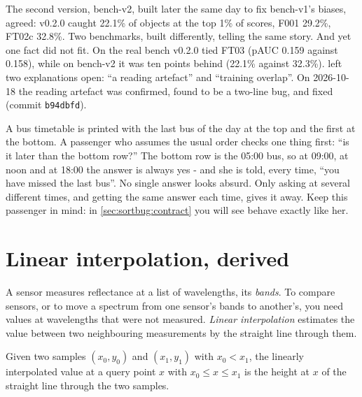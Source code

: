 
The second version, bench-v2, built later the same day to fix bench-v1's biases, agreed: v0.2.0 caught 22.1\%
of objects at the top 1\% of scores, F001 29.2\%, FT02c 32.8\%.
Two benchmarks, built differently, telling the same story. And yet one fact did not fit. On the real bench
v0.2.0 tied FT03 (pAUC 0.159 against 0.158), while on bench-v2 it was ten points behind (22.1\% against 32.3\%).
 left two explanations open: ``a reading artefact'' and ``training overlap''. On 2026-10-18
the reading artefact was confirmed, found to be a two-line bug, and fixed (commit \texttt{b94dbfd}).

\begin{analogy}
A bus timetable is printed with the last bus of the day at the top and the first at the bottom. A passenger
who assumes the usual order checks one thing first: ``is it later than the bottom row?'' The bottom row is the
05:00 bus, so at 09:00, at noon and at 18:00 the answer is always yes - and she is told, every time, ``you
have missed the last bus''. No single answer looks absurd. Only asking at several different times, and getting
the same answer each time, gives it away. Keep this passenger in mind: in \cref{sec:sortbug:contract} you will
see  behave exactly like her.
\end{analogy}

\section{Linear interpolation, derived}\label{sec:sortbug:interp}

A sensor measures reflectance at a list of wavelengths, its \emph{bands}. To compare sensors, or to move a
spectrum from one sensor's bands to another's, you need values at wavelengths that were not measured.
\emph{Linear interpolation} estimates the value between two neighbouring measurements by the straight line
through them.

\begin{definition}
Given two samples $(x_0, y_0)$ and $(x_1, y_1)$ with $x_0 < x_1$, the linearly interpolated value at a query
point $x$ with $x_0 \le x \le x_1$ is the height at $x$ of the straight line through the two samples.
\end{definition}

